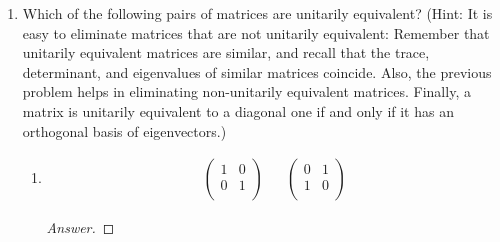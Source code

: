 \documentclass[../psets.tex]{subfiles}
\begin{document}
\begin{enumerate}[label={\textbf{6.\arabic*.}}]
\begin{enumerate}
\begin{align*}
            \begin{pmatrix}
                1 & 2\\
                2 & i\\
            \end{pmatrix}&&
            \begin{pmatrix}
                i & 4\\
                1 & 1\\
            \end{pmatrix}
        \end{align*}
        are not unitarily equivalent.
        \begin{proof}[Answer]
            We have that
            \begin{align*}
                \sum_{j,k=1}^2|A_{j,k}|^2 &= |1|^2+|2|^2+|2|^2+|i|^2&
                    \sum_{j,k=1}^n|B_{j,k}|^2 &= |i|^2+|4|^2+|1|^2+|1|^2\\
                &= 10&
                    &= 19
            \end{align*}
            Therefore, by part (b), the above matrices are not unitarily equivalent.
        \end{proof}
    \end{enumerate}
    \item Which of the following pairs of matrices are unitarily equivalent? (Hint: It is easy to eliminate matrices that are not unitarily equivalent: Remember that unitarily equivalent matrices are similar, and recall that the trace, determinant, and eigenvalues of similar matrices coincide. Also, the previous problem helps in eliminating non-unitarily equivalent matrices. Finally, a matrix is unitarily equivalent to a diagonal one if and only if it has an orthogonal basis of eigenvectors.)
    \begin{enumerate}
        \item 
        \begin{align*}
            \begin{pmatrix}
                1 & 0\\
                0 & 1\\
            \end{pmatrix}&&
            \begin{pmatrix}
                0 & 1\\
                1 & 0\\
            \end{pmatrix}
        \end{align*}
        \begin{proof}[Answer]

\end{proof}
\end{enumerate}
\end{enumerate}
\end{document}
